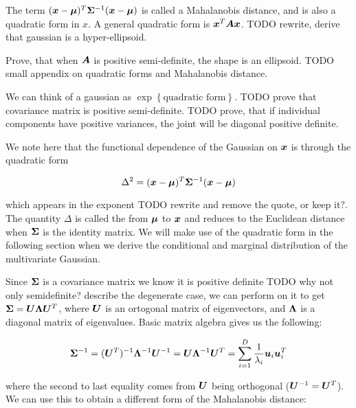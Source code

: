 \begin{tcolorbox}
    The term $({\bm{x}} - {\bm{\mu}})^T {\bm{\Sigma}}^{-1}({\bm{x}} - {\bm{\mu}})$ is called a Mahalanobis distance, and is also a quadratic form in $x$. A general quadratic form is ${\bm{x}}^T {\bm{A}} {\bm{x}}$. {TODO rewrite, derive that gaussian is a hyper-ellipsoid}.
    
    Prove, that when ${\bm{A}}$ is positive semi-definite, the shape is an ellipsoid. {TODO small appendix on quadratic forms and Mahalanobis distance}.
    
    We can think of a gaussian as $\exp{\left\{ \text{quadratic form} \right\} }$. {TODO prove that covariance matrix is positive semi-definite}. {TODO prove, that if individual components have positive variances, the joint will be diagonal positive definite}.
    
        
    We note here that the functional dependence of the Gaussian on ${\bm{x}}$ is through the quadratic form
    
    \begin{equation}
        \Delta^2 = ({\bm{x}} - {\bm{\mu}})^T {\bm{\Sigma}}^{-1} ({\bm{x}} - {\bm{\mu}})
    \end{equation}
    
    which appears in the exponent \citep{bishop2016pattern} {TODO rewrite and remove the quote, or keep it?}. The quantity $\Delta$ is called the  from ${\bm{\mu}}$ to ${\bm{x}}$ and reduces to the Euclidean distance when ${\bm{\Sigma}}$ is the identity matrix. We will make use of the quadratic form in the following section when we derive the conditional and marginal distribution of the multivariate Gaussian.
    
    Since ${\bm{\Sigma}}$ is a covariance matrix we know it is positive definite {TODO why not only semidefinite? describe the degenerate case}, we can perform  on it to get ${\bm{\Sigma}} = {\bm{U}} {\bm{\Lambda}} {\bm{U}}^T$, where ${\bm{U}}$ is an ortogonal matrix of eigenvectors, and ${\bm{\Lambda}}$ is a diagonal matrix of eigenvalues. Basic matrix algebra gives us the following:
    
    \begin{equation}
    {\bm{\Sigma}}^{-1} = ({\bm{U}}^T)^{-1} {\bm{\Lambda}}^{-1} {\bm{U}}^{-1} = {\bm{U}} {\bm{\Lambda}}^{-1} {\bm{U}}^T = \sum_{i = 1}^D \frac{1}{\lambda_i} {\bm{u}}_i {\bm{u}}_i^T
    \end{equation}
    
    where the second to last equality comes from ${\bm{U}}$ being orthogonal (${\bm{U}}^{-1} = {\bm{U}}^T$). We can use this to obtain a different form of the Mahalanobis distance:
    

\end{tcolorbox}
